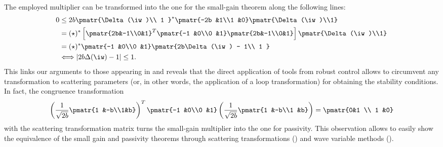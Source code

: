 {The employed multiplier can be transformed into the one for the small-gain theorem along the following lines:}
\begin{align*}
0&\leq  2b\pmatr{\Delta(\iw)\\ 1 }^*\pmatr{-2b &1\\1 &0}\pmatr{\Delta(\iw)\\1} \\\nonumber  %
&=(\star)^*\left[\pmatr{2b&-1\\0&1}^T\pmatr{-1 &0\\0 &1}\pmatr{2b&-1\\0&1}\right]\pmatr{\Delta(\iw)\\1}\\\nonumber
&=(\star)^*\pmatr{-1 &0\\0 &1}\pmatr{2b\Delta(\iw) - 1\\ 1 }\\\nonumber
&\Longleftrightarrow |2b\Delta(\iw)-1| \leq 1.
\end{align*}
This links our arguments to those appearing in \cite{colgate2,colgate6} and reveals that the direct application of tools from robust control allows to circumvent any transformation to scattering parameters (or, in other words, the application of a loop transformation) for obtaining the stability conditions. In fact, the congruence transformation
\begin{equation*}\arraycolsep0.5ex
\left(\frac{1}{\sqrt{2b}}\pmatr{1 &-b\\1&b}\right)^T\pmatr{-1 &0\\0
&1}
\left(\frac{1}{\sqrt{2b}}\pmatr{1 &-b\\1 &b}\right) = \pmatr{0&1 \\
1 &0}
\end{equation*}
with the scattering transformation matrix turns the small-gain multiplier into the one for passivity. This observation allows to easily show the equivalence of the small gain and passivity theorems through scattering transformations (\cite{andersonspong}) and wave variable methods (\cite{nieslotine,nieslotine2}).


